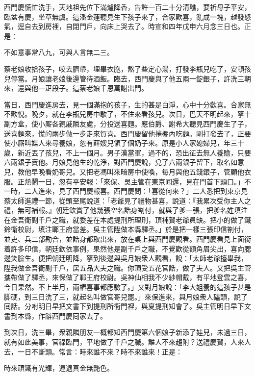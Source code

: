西門慶慌忙洗手，天地祖先位下滿爐降香，告許一百二十分清醮，要祈母子平安，臨盆有慶，坐草無虞。{}這潘金蓮聽見生下孩子來了，合家歡喜，亂成一塊，越發怒氣，逕自去到房裡，自閉門戶，向床上哭去了。{}時宣和四年戊申六月念三日也。正是：

\begin{myquote}
不如意事常八九，可與人言無二三。
\end{myquote}

蔡老娘收拾孩子，咬去臍帶，埋畢衣胞，熬了些定心湯，打發李瓶兒吃了，安頓孩兒停當。月娘讓老娘後邊管待酒飯。臨去，西門慶與了他五兩一錠銀子，許洗三朝來，還與他一疋段子。這蔡老娘千恩萬謝出門。

當日，西門慶進房去，見一個滿抱的孩子，生的甚是白淨，心中十分歡喜。合家無不歡悅。晚夕，就在李瓶兒房中歇了，不住來看孩兒。次日，巴天不明起來，拏十副方盒，使小厮各親戚隣友處，分投送喜麵。應伯爵、謝希大聽見西門慶生了子，送喜麵來，慌的兩步做一步走來賀喜。西門慶留他捲棚內吃麵。剛打發去了，正要使小厮叫媒人來尋養娘，忽有薛嫂兒領了個奶子來。原是小人家媳婦兒，年三十歲，新近丟了孩兒，不上一個月。男子漢當軍，過不的，恐出征去無人養贍，只要六兩銀子賣他。月娘見他生的乾淨，{}對西門慶說，兌了六兩銀子留下，取名如意兒，教他早晚看奶哥兒。又把老馮叫來暗房中使喚，每月與他五錢銀子，管顧他衣服。正熱鬧一日，忽有平安報：「來保、吳主管在東京囘還，見在門首下頭口。」不一時，二人進來，見了西門慶報喜。西門慶問：「喜從何來？」二人悉把到東京見蔡太師進禮一節，從頭至尾說道：「老爺見了禮物甚喜，說道：『我累次受你主人之禮，無可補報。』朝廷欽賞了他幾張空名誥身劄付，就與了爹一張，把爹名姓填注在金吾衛副千戶之職，就委差在本處提刑所理刑，頂補賀老爺員缺。把小的做了鐵鈴衛校尉，填注鄆王府當差。吳主管陞做本縣驛丞。」於是把一樣三張印信劄付，並吏、兵二部勘合，並誥身都取出來，放在桌上與西門慶觀看。西門慶看見上面銜着許多印信，朝廷欽依事例，果然他是副千戶之職，不覺歡從額角眉尖出，喜向腮邊笑臉生。便把朝廷明降，拏到後邊與吳月娘衆人觀看，說：「太師老爺擡舉我，陞我做金吾衛副千戶，居五品大夫之職。你頂受五花官誥，做了夫人。又把吳主管攜帶做了驛丞，來保做了鄆王府校尉。吳神仙相我不少紗帽戴，有平地登雲之喜，今日果然。不上半月，兩樁喜事都應驗了。」又對月娘說：「李大姐養的這孩子甚是脚硬，到三日洗了三，就起名叫做官哥兒罷。」來保進來，與月娘衆人磕頭，說了囘話。分咐明日早把文書下到提刑所衙門裡，與夏提刑知會了。吳主管明日早下文書到本縣，作辭西門慶囘家去了。

到次日，洗三畢，衆親隣朋友一概都知西門慶第六個娘子新添了娃兒，未過三日，就有如此美事，官祿臨門，平地做了千戶之職。誰人不來趨附？送禮慶賀，人來人去，一日不斷頭。常言：時來誰不來？時不來誰來！正是：

\begin{myquote}
時來頑鐵有光輝，運退真金無艷色。
\end{myquote}

